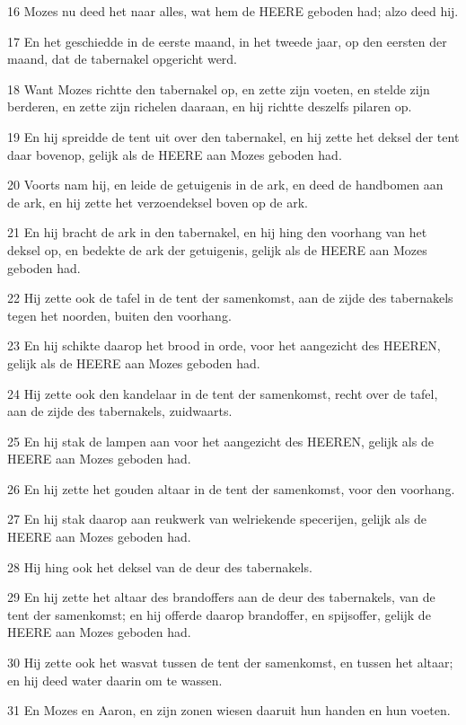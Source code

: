 \par 16 Mozes nu deed het naar alles, wat hem de HEERE geboden had; alzo deed hij.
\par 17 En het geschiedde in de eerste maand, in het tweede jaar, op den eersten der maand, dat de tabernakel opgericht werd.
\par 18 Want Mozes richtte den tabernakel op, en zette zijn voeten, en stelde zijn berderen, en zette zijn richelen daaraan, en hij richtte deszelfs pilaren op.
\par 19 En hij spreidde de tent uit over den tabernakel, en hij zette het deksel der tent daar bovenop, gelijk als de HEERE aan Mozes geboden had.
\par 20 Voorts nam hij, en leide de getuigenis in de ark, en deed de handbomen aan de ark, en hij zette het verzoendeksel boven op de ark.
\par 21 En hij bracht de ark in den tabernakel, en hij hing den voorhang van het deksel op, en bedekte de ark der getuigenis, gelijk als de HEERE aan Mozes geboden had.
\par 22 Hij zette ook de tafel in de tent der samenkomst, aan de zijde des tabernakels tegen het noorden, buiten den voorhang.
\par 23 En hij schikte daarop het brood in orde, voor het aangezicht des HEEREN, gelijk als de HEERE aan Mozes geboden had.
\par 24 Hij zette ook den kandelaar in de tent der samenkomst, recht over de tafel, aan de zijde des tabernakels, zuidwaarts.
\par 25 En hij stak de lampen aan voor het aangezicht des HEEREN, gelijk als de HEERE aan Mozes geboden had.
\par 26 En hij zette het gouden altaar in de tent der samenkomst, voor den voorhang.
\par 27 En hij stak daarop aan reukwerk van welriekende specerijen, gelijk als de HEERE aan Mozes geboden had.
\par 28 Hij hing ook het deksel van de deur des tabernakels.
\par 29 En hij zette het altaar des brandoffers aan de deur des tabernakels, van de tent der samenkomst; en hij offerde daarop brandoffer, en spijsoffer, gelijk de HEERE aan Mozes geboden had.
\par 30 Hij zette ook het wasvat tussen de tent der samenkomst, en tussen het altaar; en hij deed water daarin om te wassen.
\par 31 En Mozes en Aaron, en zijn zonen wiesen daaruit hun handen en hun voeten.

